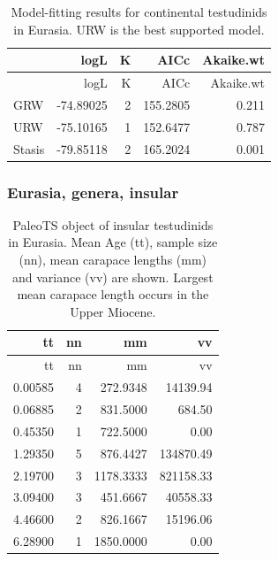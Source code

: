 \begin{longtable}[]{@{}lrrrr@{}}
	\caption[Model fits for continental \T in Eurasia]{Model-fitting results for continental testudinids in Eurasia. URW is the best supported model.}
	\label{tab:pTSEsC}
	\tabularnewline
	\toprule
	& logL & K & AICc & Akaike.wt\tabularnewline
	\midrule
	\endfirsthead
	\toprule
	& logL & K & AICc & Akaike.wt\tabularnewline
	\midrule
	\endhead
	GRW & -74.89025 & 2 & 155.2805 & 0.211\tabularnewline
	URW & -75.10165 & 1 & 152.6477 & 0.787\tabularnewline
	Stasis & -79.85118 & 2 & 165.2024 & 0.001\tabularnewline
	\bottomrule
\end{longtable}


\FloatBarrier

\subsubsection*{Eurasia, genera,
	insular}\label{eurasiagenera-insular}

\begin{longtable}[]{@{}rrrr@{}}
	\caption[PaleoTS object of insular \T in Eurasia]{PaleoTS object of insular testudinids in Eurasia. Mean Age (tt), sample size (nn), mean carapace lengths (mm) and variance (vv) are shown. Largest mean carapace length occurs in the Upper Miocene.}
	\label{tab:pTSEurI}
	\tabularnewline
	\toprule
	tt & nn & mm & vv\tabularnewline
	\midrule
	\endfirsthead
	\toprule
	tt & nn & mm & vv\tabularnewline
	\midrule
	\endhead
	0.00585 & 4 & 272.9348 & 14139.94\tabularnewline
	0.06885 & 2 & 831.5000 & 684.50\tabularnewline
	0.45350 & 1 & 722.5000 & 0.00\tabularnewline
	1.29350 & 5 & 876.4427 & 134870.49\tabularnewline
	2.19700 & 3 & 1178.3333 & 821158.33\tabularnewline
	3.09400 & 3 & 451.6667 & 40558.33\tabularnewline
	4.46600 & 2 & 826.1667 & 15196.06\tabularnewline
	6.28900 & 1 & 1850.0000 & 0.00\tabularnewline
	\bottomrule
\end{longtable}

